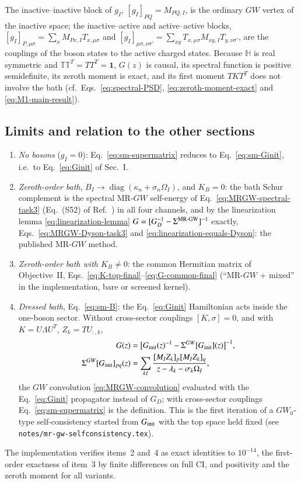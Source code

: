 \documentclass[aip,jcp,reprint,noshowkeys,superscriptaddress]{revtex4-1}
\begin{document}
The inactive--inactive block of $g_I$, $[g_I]_{PQ}=M_{PQ,I}$, is the
ordinary $GW$ vertex of the inactive space; the inactive--active and
active--active blocks, $[g_I]_{P,\mu\sigma}=\sum_xM_{Px,I}T_{x,\mu\sigma}$ and
$[g_I]_{\mu\sigma,\nu\sigma'}=\sum_{xy}T_{x,\mu\sigma}M_{xy,I}T_{y,\nu\sigma'}$,
are the couplings of the boson states to the active charged states.
Because $\mathbb H$ is real symmetric and $\mathbb T\mathbb T^{T}=TT^{T}=\mathbf 1$,
$G(z)$ is causal, its spectral function is positive semidefinite, its
zeroth moment is exact, and its first moment $TKT^{T}$ does not involve the
bath (cf.\ Eqs.~\eqref{eq:spectral-PSD}, \eqref{eq:zeroth-moment-exact} and
\eqref{eq:M1-main-result}).

\subsection{Limits and relation to the other sections}

\begin{enumerate}
\item \emph{No bosons} ($g_I=0$): Eq.~\eqref{eq:sm-supermatrix} reduces to
  Eq.~\eqref{eq:sm-Ginit}, i.e.\ to Eq.~\eqref{eq:Ginit} of Sec.~I.
\item \emph{Zeroth-order bath}, $B_I\to\operatorname{diag}(\kappa_n+\sigma_n\Omega_I)$,
  and $K_B=0$: the bath Schur complement is the spectral MR-$GW$
  self-energy of Eq.~\eqref{eq:MRGW-spectral-task3} (Eq.~(S52) of
  Ref.~\cite{WangFangLi2026}) in all four channels, and by the
  linearization lemma \eqref{eq:linearization-lemma}
  $G=[G_D^{-1}-\Sigma^{\rm MR\text{-}GW}]^{-1}$ exactly,
  Eqs.~\eqref{eq:MRGW-Dyson-task3} and \eqref{eq:linearization-equals-Dyson}:
  the published MR-$GW$ method.
\item \emph{Zeroth-order bath with $K_B\neq0$}: the common Hermitian matrix
  of Objective~II, Eqs.~\eqref{eq:K-top-final}--\eqref{eq:G-common-final}
  (``MR-$GW$ + mixed'' in the implementation, bare or screened kernel).
\item \emph{Dressed bath}, Eq.~\eqref{eq:sm-B}: the Eq.~\eqref{eq:Ginit}
  Hamiltonian acts inside the one-boson sector.  Without cross-sector
  couplings $[K,\sigma]=0$, and with $K=U\Lambda U^{T}$, $Z_k=TU_{:,k}$,
  \begin{align}
    G(z)&=\bigl[G_{\rm init}(z)^{-1}-\Sigma^{GW}[G_{\rm init}](z)\bigr]^{-1},
    \label{eq:sm-dressed}\\
    \Sigma^{GW}[G_{\rm init}]_{pq}(z)&=\sum_{kI}\frac{[M_IZ_k]_p[M_IZ_k]_q}{z-\lambda_k-\sigma_k\Omega_I},\nonumber
  \end{align}
  the $GW$ convolution \eqref{eq:MRGW-convolution} evaluated with the
  Eq.~\eqref{eq:Ginit} propagator instead of $G_D$; with cross-sector
  couplings Eq.~\eqref{eq:sm-supermatrix} is the definition.  This is the
  first iteration of a $GW_0$-type self-consistency started from
  $G_{\rm init}$ with the top space held fixed (see
  \texttt{notes/mr-gw-selfconsistency.tex}).
\end{enumerate}
The implementation verifies items~2 and~4 as exact identities to
$10^{-14}$, the first-order exactness of item~3 by finite differences on
full CI, and positivity and the zeroth moment for all variants.
\end{document}
